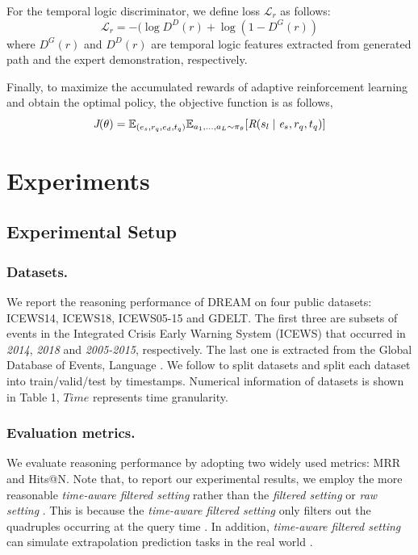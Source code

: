 \documentclass[sigconf,natbib=true]{acmart}
\begin{document}
For the temporal logic discriminator, we define loss $\mathcal{L}_r$  as follows:
 \begin{equation}
	\mathcal{L}_r = -(\log D^D(r) +\log(1-D^G(r))
\end{equation}
where $D^G(r)$ and $D^D(r)$ are temporal logic features extracted from generated path and the expert demonstration, respectively.


Finally, to maximize the accumulated rewards of adaptive reinforcement learning and obtain the optimal policy, the objective function is as follows,
\begin{equation}
\emph{J}(\theta) = \mathbb{E}_{(e_s,r_q,e_d,t_q)} \mathbb{E}_{a_1,...,a_{L}\sim{\emph{$\pi$}_\theta}}[\emph{R} (s_l\mid\emph{e}_s,r_q,t_q)]
\end{equation}



\section{Experiments}




\subsection{Experimental Setup}
\subsubsection{Datasets.}
We report the reasoning performance of DREAM on four public datasets: ICEWS14, ICEWS18, ICEWS05-15 and GDELT. The first three are subsets of events in the Integrated Crisis Early Warning System (ICEWS) that occurred in \emph{2014}, \emph{2018} and \emph{2005-2015}, respectively. The last one is extracted from the Global Database of Events, Language \cite{gdelt}. We follow \cite{TiTer} to split datasets  and split each dataset into train/valid/test by timestamps.  Numerical information of datasets is shown in Table 1, $Time$ represents time granularity. 

\subsubsection{Evaluation metrics.}
We evaluate reasoning performance by adopting two widely used metrics: MRR and  
 Hits@N. Note that, to report our experimental results, we employ the more reasonable \emph{time-aware filtered setting} \cite{TiRGN} rather than the  \emph{filtered setting} \cite{HIP, CENET} or \emph{raw setting} \cite{rGalT, DA-NET}. This is because the \emph{time-aware filtered setting} only filters out the quadruples occurring at the query time \cite{HiSMatch}. In addition, \emph{time-aware filtered setting} can simulate extrapolation prediction tasks in the real world  \cite{TiTer}.
\end{document}
